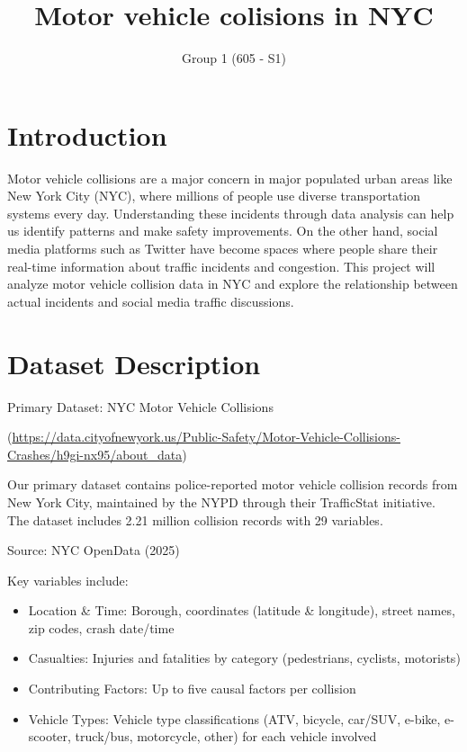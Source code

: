 \documentclass[10pt]{article}\usepackage[]{graphicx}\usepackage[]{xcolor}
\begin{document}
\title{Motor vehicle colisions in NYC}
\author{Group 1 (605 - S1)}
\maketitle
\tableofcontents

\newpage

\section{Introduction}

Motor vehicle collisions are a major concern in major populated urban areas like New York City (NYC), where millions of people use diverse transportation systems every day. Understanding these incidents through data analysis can help us identify patterns and make safety improvements. On the other hand, social media platforms such as Twitter have become spaces where people share their real-time information about traffic incidents and congestion. This project will analyze motor vehicle collision data in NYC and explore the relationship between actual incidents and social media traffic discussions. 

\section{Dataset Description}
Primary Dataset: NYC Motor Vehicle Collisions 

(\url{https://data.cityofnewyork.us/Public-Safety/Motor-Vehicle-Collisions-Crashes/h9gi-nx95/about_data})

Our primary dataset contains police-reported motor vehicle collision records from New York City, maintained by the NYPD through their TrafficStat initiative. The dataset includes 2.21 million collision records with 29 variables.


Source: NYC OpenData (2025)


Key variables include:
\begin{itemize}
  \item Location \& Time: Borough, coordinates (latitude \& longitude), street names, zip codes, crash date/time
  \item Casualties: Injuries and fatalities by category (pedestrians, cyclists, motorists)
  \item Contributing Factors: Up to five causal factors per collision
  \item Vehicle Types: Vehicle type classifications (ATV, bicycle, car/SUV, e-bike, e-scooter, truck/bus, motorcycle, other) for each vehicle involved
\end{itemize}
\end{document}
